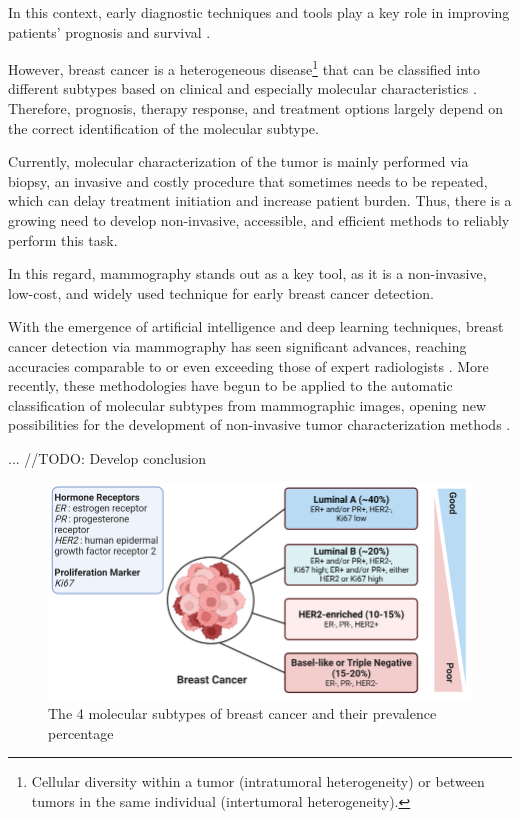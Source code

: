 \documentclass[a4paper,10pt]{book}
\begin{document}
In this context, early diagnostic techniques and tools play a key role in improving patients' prognosis and survival \cite{wang_early_2017}.

However, breast cancer is a heterogeneous disease\footnote{Cellular diversity within a tumor (intratumoral heterogeneity) or between tumors in the same individual (intertumoral heterogeneity).} that can be classified into different subtypes based on clinical and especially molecular characteristics \cite{orrantia-borunda_subtypes_2022}. Therefore, prognosis, therapy response, and treatment options largely depend on the correct identification of the molecular subtype.

Currently, molecular characterization of the tumor is mainly performed via biopsy, an invasive and costly procedure that sometimes needs to be repeated, which can delay treatment initiation and increase patient burden. Thus, there is a growing need to develop non-invasive, accessible, and efficient methods to reliably perform this task.

In this regard, mammography stands out as a key tool, as it is a non-invasive, low-cost, and widely used technique for early breast cancer detection.

With the emergence of artificial intelligence and deep learning techniques, breast cancer detection via mammography has seen significant advances, reaching accuracies comparable to or even exceeding those of expert radiologists \cite{pattanaik_breast_2022, meenalochini_deep_2024, zahoor_breast_2022}. More recently, these methodologies have begun to be applied to the automatic classification of molecular subtypes from mammographic images, opening new possibilities for the development of non-invasive tumor characterization methods \cite{mota_breast_2024, ben_rabah_multimodal_2025}.

... //TODO: Develop conclusion

\begin{figure}
    \centering
    \includegraphics[width=0.8\linewidth]{reports/assets/subtypes.png}
    \caption{The 4 molecular subtypes of breast cancer and their prevalence percentage \cite{harnessing_2024}}
    \label{fig:subtypes}
\end{figure}
\end{document}
